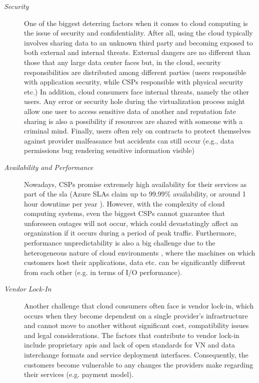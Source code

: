 \begin{description}
    \item [\textit{Security}] One of the biggest deterring factors when it comes to cloud computing is the issue of security and confidentiality. After all, using the cloud typically involves sharing data to an unknown third party and becoming exposed to both external and internal threats. External dangers are no different than those that any large data center faces but, in the cloud, security responsibilities are distributed among different parties (users responsible with application security, while CSPs responsible with physical security etc.) In addition, cloud consumers face internal threats, namely the other users. Any error or security hole during the virtualization process might allow one user to access sensitive data of another and reputation fate sharing is also a possibility if resources are shared with someone with a criminal mind. Finally, users often rely on contracts to protect themselves against provider malfeasance but accidents can still occur (e.g., data permissions bug rendering sensitive information visible)
    
    \item[\textit{Availability and Performance}] Nowadays, CSPs promise extremely high availability for their services as part of the \ac{sla} (Azure SLAs claim up to 99.99\% availability, or around 1 hour downtime per year \cite{availability}). However, with the complexity of cloud computing systems,  even the biggest CSPs cannot guarantee that unforeseen outages will not occur, which could devastatingly affect an organization if it occurs during a period of peak traffic. Furthermore, performance unpredictability is also a big challenge due to the heterogeneous nature of cloud environments \cite{performance}, where the machines on which customers host their applications, data etc. can be significantly different from each other (e.g. in terms of I/O performance). 
    
    \item[\textit{Vendor Lock-In}]  Another challenge that cloud consumers often face is vendor lock-in,  which occurs when they become dependent on a single provider's infrastructure and cannot move to another without significant cost, compatibility issues and legal considerations. The factors that contribute to vendor lock-in include proprietary \ac{api}s and lack of open standards for VN and data interchange formats and service deployment interfaces. Consequently, the customers become vulnerable to any changes the providers make regarding their services (e.g. payment model). \cite{lock-in}
    

\end{description}
